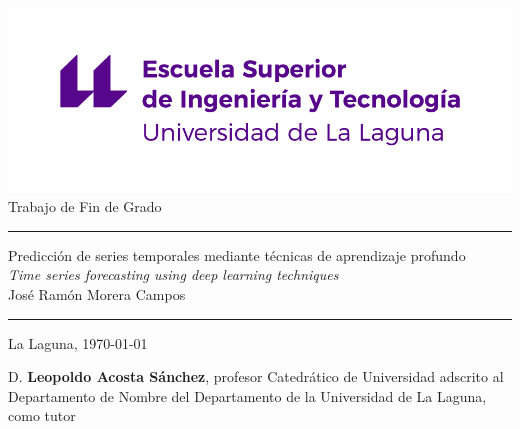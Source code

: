 \documentclass[spanish,a4paper,12pt,oneside]{extreport}
\begin{document}
\renewcommand\listtablename{Índice de Tablas}    
\renewcommand\listfigurename{Índice de Figuras}    

\pagestyle{empty}
\thispagestyle{empty}


\newcommand{\HRule}{\rule{\linewidth}{1mm}}
\setlength{\parindent}{0mm}
\setlength{\parskip}{0mm}


\begin{center}
\includegraphics[scale=0.8]{images/escuela-ingenieria-tecnologia-original}\\[10mm]
{\Huge Trabajo de Fin de Grado}
\end{center}

\HRule
\begin{flushright}
        {\Huge Predicción de series temporales mediante técnicas de aprendizaje profundo } \\[2.5mm]
        {\Large \textit{Time series forecasting using deep learning techniques}} \\[5mm]
        {\Large José Ramón Morera Campos} \\[5mm]


\end{flushright}
\HRule
{}
\begin{center}
  \Large La Laguna, \today
\end{center}

\setlength{\parindent}{5mm}

\newpage
\thispagestyle{empty}

D. {\bf Leopoldo Acosta Sánchez}, profesor Catedrático de Universidad adscrito al Departamento de Nombre del Departamento de la Universidad de La Laguna, como tutor
\end{document}
